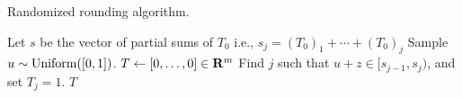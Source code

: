 {
\vskip -0.07in
\begin{algorithm}[h!]
\caption{Randomized rounding algorithm.}
\label{alg:round}
\begin{algorithmic}[1]
\State Let $s$ be the vector of partial sums of $T_0$ \Comment i.e., $s_j = (T_0)_1 + \cdots + (T_0)_j$
\State Sample $u \sim \operatorname{Uniform}([0,1])$.
\State $T \gets [0,\ldots,0] \in \mathbf{R}^m$
\State Find $j$ such that $u+z \in [s_{j-1},s_j)$, and set $T_j = 1$. 
\EndFor
\State \Return $T$
\EndProcedure
\end{algorithmic}
\end{algorithm}
\vskip -0.07in
}
